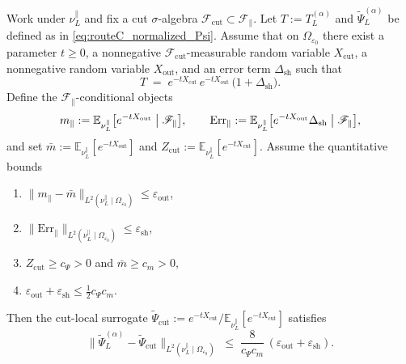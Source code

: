\begin{lemma}\label{lem:routeC_surrogate_sufficient_conditions}
Work under $\nu_L^{\parallel}$ and fix a cut $\sigma$-algebra $\mathscr F_{\mathrm{cut}}\subset\mathscr F_{\parallel}$.
Let $T:=T_L^{(\alpha)}$ and $\widetilde\Psi_L^{(\alpha)}$ be defined as in \eqref{eq:routeC_normalized_Psi}.
Assume that on $\Omega_{\varepsilon_0}$ there exist a parameter $t\ge 0$, a nonnegative $\mathscr F_{\mathrm{cut}}$-measurable random variable $X_{\mathrm{cut}}$,
a nonnegative random variable $X_{\mathrm{out}}$, and an error term $\Delta_{\mathrm{sh}}$ such that
\begin{equation}\label{eq:routeC_T_factor_cut_out}
T \;=\; e^{-t X_{\mathrm{cut}}}\,e^{-t X_{\mathrm{out}}}\,\bigl(1+\Delta_{\mathrm{sh}}\bigr).
\end{equation}
Define the $\mathscr F_{\parallel}$-conditional objects
\[
m_\parallel := \mathbb E_{\nu_L^{\parallel}}\bigl[e^{-tX_{\mathrm{out}}}\bigm|\mathscr F_\parallel\bigr],
\qquad
\mathrm{Err}_\parallel := \mathbb E_{\nu_L^{\parallel}}\bigl[e^{-tX_{\mathrm{out}}}\Delta_{\mathrm{sh}}\bigm|\mathscr F_\parallel\bigr],
\]
and set $\bar m := \mathbb E_{\nu_L^{\parallel}}[e^{-tX_{\mathrm{out}}}]$ and $Z_{\mathrm{cut}}:=\mathbb E_{\nu_L^{\parallel}}[e^{-tX_{\mathrm{cut}}}]$.
Assume the quantitative bounds
\begin{enumerate}[label=(\roman*)]
\item $\| m_\parallel - \bar m\|_{L^2(\nu_L^{\parallel}\mid\Omega_{\varepsilon_0})}\le \varepsilon_{\mathrm{out}}$,
\item $\| \mathrm{Err}_\parallel\|_{L^2(\nu_L^{\parallel}\mid\Omega_{\varepsilon_0})}\le \varepsilon_{\mathrm{sh}}$,
\item $Z_{\mathrm{cut}} \ge c_\Psi>0$ and $\bar m \ge c_m>0$,
\item $\varepsilon_{\mathrm{out}}+\varepsilon_{\mathrm{sh}} \le \tfrac12 c_\Psi c_m$.
\end{enumerate}
Then the cut-local surrogate $\widetilde\Psi_{\mathrm{cut}} := e^{-tX_{\mathrm{cut}}}/\mathbb E_{\nu_L^{\parallel}}[e^{-tX_{\mathrm{cut}}}]$ satisfies
\[
\bigl\|\widetilde\Psi_L^{(\alpha)} - \widetilde\Psi_{\mathrm{cut}}\bigr\|_{L^2(\nu_L^{\parallel}\mid\Omega_{\varepsilon_0})}
\;\le\;
\frac{8}{c_\Psi c_m}\,(\varepsilon_{\mathrm{out}}+\varepsilon_{\mathrm{sh}}).
\]
\end{lemma}

